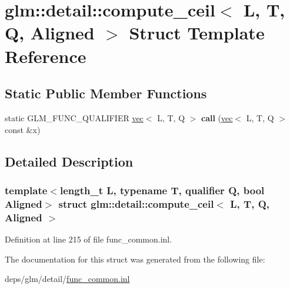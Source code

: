 \hypertarget{structglm_1_1detail_1_1compute__ceil}{}\section{glm\+:\+:detail\+:\+:compute\+\_\+ceil$<$ L, T, Q, Aligned $>$ Struct Template Reference}
\label{structglm_1_1detail_1_1compute__ceil}
\subsection*{Static Public Member Functions}
\begin{DoxyCompactItemize}
\item 
\mbox{\label{structglm_1_1detail_1_1compute__ceil_aa0594e4c508780f45c9f7956e143e591}} 
static G\+L\+M\+\_\+\+F\+U\+N\+C\+\_\+\+Q\+U\+A\+L\+I\+F\+I\+ER \hyperlink{structglm_1_1vec}{vec}$<$ L, T, Q $>$ {\bfseries call} (\hyperlink{structglm_1_1vec}{vec}$<$ L, T, Q $>$ const \&x)
\end{DoxyCompactItemize}


\subsection{Detailed Description}
\subsubsection*{template$<$length\+\_\+t L, typename T, qualifier Q, bool Aligned$>$\newline
struct glm\+::detail\+::compute\+\_\+ceil$<$ L, T, Q, Aligned $>$}



Definition at line 215 of file func\+\_\+common.\+inl.



The documentation for this struct was generated from the following file\+:\begin{DoxyCompactItemize}
\item 
deps/glm/detail/\hyperlink{func__common_8inl}{func\+\_\+common.\+inl}\end{DoxyCompactItemize}
